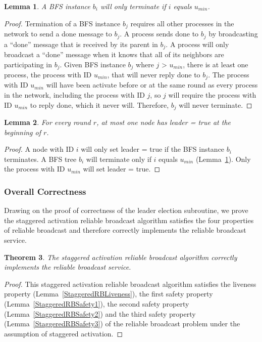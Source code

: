 \documentclass[english]{article}
\newtheorem{theorem}{Theorem}[section]
\newtheorem{lemma}[theorem]{Lemma}
\begin{document}
\begin{lemma}
\label{BFSTerminationStaggered}
  A BFS instance $b_i$ will only terminate if $i$ equals $u_{min}$.
\end{lemma}
\begin{proof}
Termination of a BFS instance $b_j$ requires all other processes in the network to send a done message to $b_j$. A process sends done to $b_j$ by broadcasting a ``done'' message that is received by its parent in $b_j$. A process will only broadcast a ``done'' message when it knows that all of its neighbors are participating in $b_j$.
Given BFS instance $b_j$ where $j$ \textgreater $ $ $u_{min}$, there is at least one process, the process with ID $u_{min}$, that will never reply done to $b_j$. The process with ID $u_{min}$ will have been activate before or at the same round as every process in the network, including the process with ID $j$, so $j$ will require the process with ID $u_{min}$ to reply done, which it never will.
Therefore, $b_j$ will never terminate.
\end{proof}


\begin{lemma}
\label{LESafetyStaggered}
For every round $r$, at most one node has leader = true at the beginning of $r$.
\end{lemma}
\begin{proof}
A node with ID $i$ will only set leader = true if the BFS instance $b_i$ terminates.
A BFS tree $b_i$ will terminate only if $i$ equals $u_{min}$ (Lemma~\ref{BFSTerminationStaggered}).
Only the process with ID $u_{min}$ will set leader = true. 
\end{proof}


\subsubsection{Overall Correctness}

Drawing on the proof of correctness of the leader election subroutine, we prove the staggered activation reliable broadcast algorithm satisfies the four properties of reliable broadcast and therefore correctly implements the reliable broadcast service.

\begin{theorem}
\label{StaggeredReliableBroadcast}
The staggered activation reliable broadcast algorithm correctly implements the reliable broadcast service.
\end{theorem}
\begin{proof}
This staggered activation reliable broadcast algorithm satisfies the liveness property (Lemma~\ref{StaggeredRBLiveness}), 
the first safety property (Lemma~\ref{StaggeredRBSafety1}),
the second safety property (Lemma~\ref{StaggeredRBSafety2}) and 
the third safety property (Lemma~\ref{StaggeredRBSafety3}) of the reliable broadcast problem under the assumption of staggered activation.
\end{proof}
\end{document}

